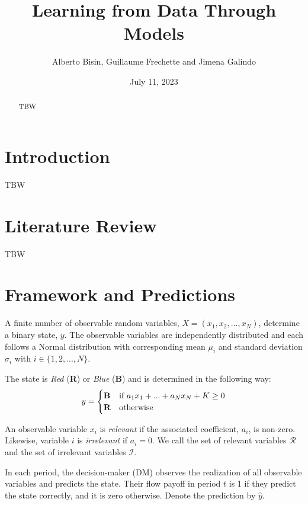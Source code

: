 \documentclass[
  12pt,
]{article}
\title{Learning from Data Through Models}
\author{Alberto Bisin, Guillaume Frechette and Jimena Galindo}
\date{July 11, 2023}
\begin{document}
\maketitle
\begin{abstract}
TBW
\end{abstract}

\hypertarget{introduction}{%
\section{Introduction}\label{introduction}}

TBW

\hypertarget{literature-review}{%
\section{Literature Review}\label{literature-review}}

TBW

\hypertarget{framework-and-predictions}{%
\section{Framework and Predictions}\label{framework-and-predictions}}

A finite number of observable random variables,
\(X =(x_1, x_2, ..., x_N)\), determine a binary state, \(y\). The
observable variables are independently distributed and each follows a
Normal distribution with corresponding mean \(\mu_i\) and standard
deviation \(\sigma_i\) with \(i \in \{1, 2, ..., N\}\).

The state is \emph{Red} (\textbf{R}) or \emph{Blue} (\textbf{B}) and is
determined in the following way: \begin{equation*}
y = \begin{cases}
\text{\textbf{B}} &\text{if $a_1x_1+...+a_Nx_N + K\geq0$}\\
\text{\textbf{R}} &\text{otherwise}
\end{cases}
\end{equation*}

An observable variable \(x_i\) is \emph{relevant} if the associated
coefficient, \(a_i\), is non-zero. Likewise, variable \(i\) is
\emph{irrelevant} if \(a_i = 0\). We call the set of relevant variables
\(\mathcal{R}\) and the set of irrelevant variables \(\mathcal{I}\).

In each period, the decision-maker (DM) observes the realization of all
observable variables and predicts the state. Their flow payoff in period
\(t\) is 1 if they predict the state correctly, and it is zero
otherwise. Denote the prediction by \(\hat{y}\).
\end{document}

